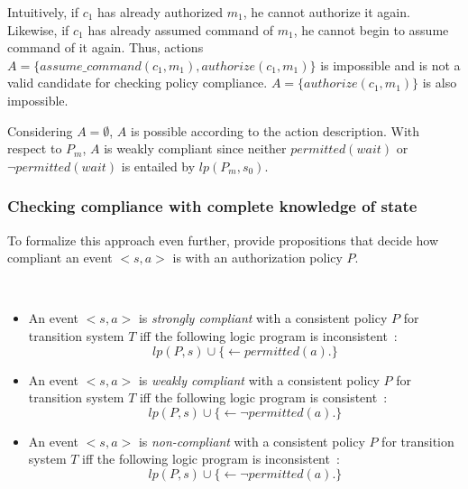 Intuitively, if $c_1$ has already authorized $m_1$, he cannot authorize it again.
Likewise, if $c_1$ has already assumed command of $m_1$, he cannot begin to assume command of it again.
Thus, actions $A = \{assume\_command(c_1, m_1), authorize(c_1, m_1)\}$ is impossible and is not a valid candidate for checking policy compliance.
$A = \{authorize(c_1, m_1)\}$ is also impossible.

Considering $A=\emptyset$, $A$ is possible according to the action description.
With respect to $P_m$, $A$ is weakly compliant since neither $permitted(wait)$ or $\neg permitted(wait)$ is entailed by $lp(P_m, s_0)$.

\subsubsection{Checking compliance with complete knowledge of state}

To formalize this approach even further, \citet{gelfond_authorization_2008} provide propositions that decide how compliant an event $<s,a>$ is with an authorization policy $P$.

\begin{definition}
    \label{def:authorization_event_compliance_full_knowledge}
    ~

    \begin{itemize}
        \item An event $<s, a>$ is \textit{strongly compliant} with a consistent policy $P$ for transition system $T$ iff the following logic program is inconsistent~\citep{gelfond_authorization_2008}:
            \begin{equation}
                lp(P, s) \cup \{ \leftarrow permitted(a). \}
            \end{equation}
        \item An event $<s, a>$ is \textit{weakly compliant} with a consistent policy $P$ for transition system $T$ iff the following logic program is consistent~\citep{gelfond_authorization_2008}:
            \begin{equation}
                lp(P, s) \cup \{ \leftarrow \neg permitted(a). \}
            \end{equation}
        \item An event $<s, a>$ is \textit{non-compliant} with a consistent policy $P$ for transition system $T$ iff the following logic program is inconsistent~\citep{gelfond_authorization_2008}:
            \begin{equation}
                lp(P, s) \cup \{ \leftarrow \neg permitted(a). \}
            \end{equation}
    \end{itemize}
\end{definition}

